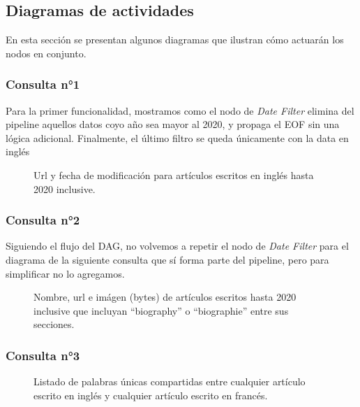 \subsection{Diagramas de actividades}
En esta sección se presentan algunos diagramas que ilustran cómo actuarán los nodos en conjunto.

\subsubsection{Consulta n°1}
Para la primer funcionalidad, mostramos como el nodo de \textit{Date Filter} elimina del pipeline aquellos datos coyo año sea mayor al 2020, y propaga el EOF sin una lógica adicional. Finalmente, el último filtro se queda únicamente con la data en inglés 
\begin{figure}[H]
    \centering
    
    \caption{Url y fecha de modificación para artículos escritos en inglés hasta 2020 inclusive.}
    \label{fig:query-1}
\end{figure}


\subsubsection{Consulta n°2}
Siguiendo el flujo del DAG, no volvemos a repetir el nodo de \textit{Date Filter} para el diagrama de la siguiente consulta que sí forma parte del pipeline, pero para simplificar no lo agregamos.
\begin{figure}[H]
    \centering
    
    \caption{Nombre, url e imágen (bytes) de artículos escritos hasta 2020 inclusive que incluyan
“biography” o “biographie” entre sus secciones.}
    \label{fig:query-2}
\end{figure}

\subsubsection{Consulta n°3}
\begin{figure}[H]
    \centering
    
    \caption{Listado de palabras únicas compartidas entre cualquier artículo escrito en inglés y
cualquier artículo escrito en francés.}
    \label{fig:query-3}
\end{figure}

